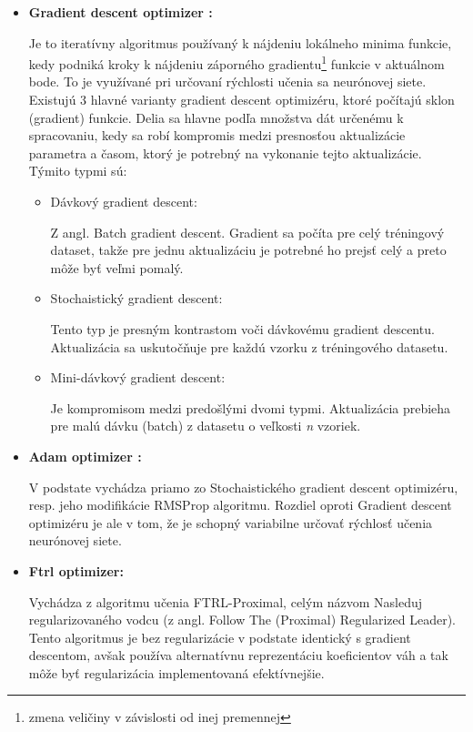 \begin{itemize}
	\item \textbf{Gradient descent optimizer \cite{gradient_descent}:}
	
	Je to iteratívny algoritmus používaný k nájdeniu lokálneho minima funkcie, kedy podniká kroky k nájdeniu záporného gradientu\footnote{ zmena veličiny v závislosti od inej premennej} funkcie v aktuálnom bode. To je využívané pri určovaní rýchlosti učenia sa neurónovej siete. Existujú 3 hlavné varianty gradient descent optimizéru, ktoré počítajú sklon (gradient) funkcie. Delia sa hlavne podľa množstva dát určenému k spracovaniu, kedy sa robí kompromis medzi presnosťou aktualizácie parametra a časom, ktorý je potrebný na vykonanie tejto aktualizácie. Týmito typmi sú:
	\begin{itemize}
		\item{Dávkový gradient descent:}
		
		Z angl. Batch gradient descent. Gradient sa počíta pre celý tréningový dataset, takže pre jednu aktualizáciu je potrebné ho prejsť celý a preto môže byť veľmi pomalý. 
		\item {Stochaistický gradient descent:}
		
		Tento typ je presným kontrastom voči dávkovému gradient descentu. Aktualizácia sa uskutočňuje pre každú vzorku z tréningového datasetu. 
		\item{Mini-dávkový gradient descent:}
		
		Je kompromisom medzi predošlými dvomi typmi. Aktualizácia prebieha pre malú dávku (batch) z datasetu o veľkosti \textit{n} vzoriek.
	\end{itemize} 
	\item \textbf{Adam optimizer \cite{adam}:}
	
	V podstate vychádza priamo zo Stochaistického gradient descent optimizéru, resp. jeho modifikácie RMSProp algoritmu\cite{rms}. Rozdiel oproti Gradient descent optimizéru je ale v tom, že je schopný variabilne určovať rýchlosť učenia neurónovej siete.
	
	
	\item \textbf{Ftrl optimizer:}
	
	Vychádza z algoritmu učenia FTRL-Proximal\cite{ftrl}, celým názvom Nasleduj regularizovaného vodcu (z angl. Follow The (Proximal) Regularized Leader). Tento algoritmus je bez regularizácie v podstate identický s gradient descentom, avšak používa alternatívnu reprezentáciu koeficientov váh a tak môže byť regularizácia implementovaná efektívnejšie.
\end{itemize}

